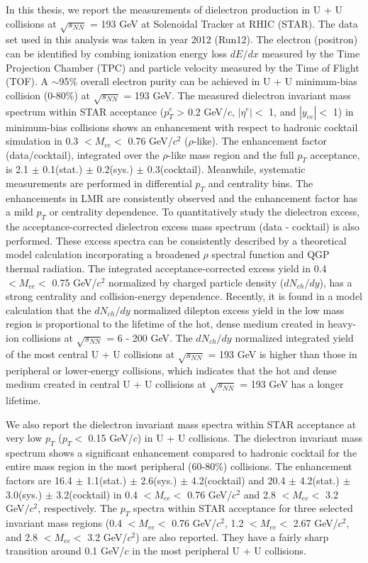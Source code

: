 \begin{enabstract}
In this thesis, we report the measurements of dielectron production in U + U collisions at $\sqrt{s_{NN}}$ = 193 GeV at Solenoidal Tracker at RHIC (STAR). The data set used in this analysis was taken in year 2012 (Run12). The electron (positron) can be identified by combing ionization energy loss $dE/dx$ measured by the Time Projection Chamber (TPC) and particle velocity measured by the Time of Flight (TOF). A $\sim$95\% overall electron purity can be achieved in U + U minimum-bias collision (0-80\%) at $\sqrt{s_{NN}}$ = 193 GeV. The measured dielectron invariant mass spectrum within STAR acceptance ($p_{T}^{e}$ > 0.2 GeV/$c$, $|\eta^{e}|<$ 1, and $|y_{ee}|<$ 1) in minimum-bias collisions shows an enhancement with respect to hadronic cocktail simulation in 0.3 $<M_{ee}<$ 0.76 GeV/$c^{2}$ ($\rho$-like). The enhancement factor (data/cocktail), integrated over the $\rho$-like mass region and the full $p_{T}$ acceptance, is 2.1 $\pm$ 0.1(stat.) $\pm$ 0.2(sys.) $\pm$ 0.3(cocktail). Meanwhile, systematic measurements are performed in differential $p_{T}$ and centrality bins. The enhancements in LMR are consistently observed and the enhancement factor has a mild $p_{T}$ or centrality dependence. To quantitatively study the dielectron excess, the acceptance-corrected dielectron excess mass spectrum (data - cocktail) is also performed. These excess spectra can be consistently described by a theoretical model calculation incorporating a broadened $\rho$ spectral function and QGP thermal radiation. The integrated acceptance-corrected excess yield in 0.4 $<M_{ee}<$ 0.75 GeV/$c^{2}$ normalized by charged particle density ($dN_{ch}/dy$), has a strong centrality and collision-energy dependence. Recently, it is found in a model calculation that the $dN_{ch}/dy$ normalized dilepton excess yield in the low mass region is proportional to the lifetime of the hot, dense medium created in heavy-ion collisions at $\sqrt{s_{NN}}$ = 6 - 200 GeV. The $dN_{ch}/dy$ normalized integrated yield of the most central U + U collisions at $\sqrt{s_{NN}}$ = 193 GeV is higher than those in peripheral or lower-energy collisions, which indicates that the hot and dense medium created in central U + U collisions at $\sqrt{s_{NN}}$ = 193 GeV has a longer lifetime.

We also report the dielectron invariant mass spectra within STAR acceptance at very low $p_{T}$ ($p_{T}<$ 0.15 GeV/$c$) in U + U collisions. The dielectron invariant mass spectrum shows a significant enhancement compared to hadronic cocktail for the entire mass region in the most peripheral (60-80\%) collisions. The enhancement factors are 16.4 $\pm$ 1.1(stat.) $\pm$ 2.6(sys.) $\pm$ 4.2(cocktail) and 20.4 $\pm$ 4.2(stat.) $\pm$ 3.0(sys.) $\pm$ 3.2(cocktail) in 0.4 $<M_{ee}<$ 0.76 GeV/$c^{2}$ and 2.8 $<M_{ee}<$ 3.2 GeV/$c^{2}$, respectively. The $p_{T}$ spectra within STAR acceptance for three selected invariant mass regions (0.4 $<M_{ee}<$ 0.76 GeV/$c^{2}$, 1.2 $<M_{ee}<$ 2.67 GeV/$c^{2}$, and 2.8 $<M_{ee}<$ 3.2 GeV/$c^{2}$) are also reported. They have a fairly sharp transition around 0.1 GeV/$c$ in the most peripheral U + U collisions.


\end{enabstract}
